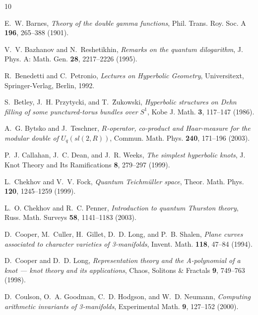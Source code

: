 \documentclass[12pt,reqno]{amsart}
\numberwithin{equation}{section}
\begin{document}
\begin{thebibliography}{10}
\providecommand{\url}[1]{\texttt{#1}}
\providecommand{\urlprefix}{URL }
\providecommand{\eprint}[2][]{\url{#2}}

E.~W. Barnes, \emph{Theory of the double gamma functions}, Phil. Trans. Roy.
  Soc. A \textbf{196}, 265--388 (1901).

V.~V. Bazhanov and N.~Reshetikhin, \emph{Remarks on the quantum dilogarithm},
  J. Phys. A: Math. Gen. \textbf{28}, 2217--2226 (1995).

R.~Benedetti and C.~Petronio, \emph{Lectures on Hyperbolic Geometry},
  Universitext, Springer-Verlag, Berlin, 1992.

S.~Betley, J.~H. Przytycki, and T.~\r{Z}ukowski, \emph{Hyperbolic structures on
  {Dehn} filling of some punctured-torus bundles over {$S^1$}}, Kobe J. Math.
  \textbf{3}, 117--147 (1986).

A.~G. Bytsko and J.~Teschner, \emph{{$R$}-operator, co-product and
  {Haar}-measure for the modular double of {$U_q(sl(2,R))$}}, Commun. Math.
  Phys. \textbf{240}, 171--196 (2003).

P.~J. Callahan, J.~C. Dean, and J.~R. Weeks, \emph{The simplest hyperbolic
  knots}, J. Knot Theory and Its Ramifications \textbf{8}, 279--297 (1999).

L.~Chekhov and V.~V. Fock, \emph{Quantum {Teichm{\"u}ller} space}, Theor. Math.
  Phys. \textbf{120}, 1245--1259 (1999).

L.~O. Chekhov and R.~C. Penner, \emph{Introduction to quantum {Thurston}
  theory}, Russ. Math. Surveys \textbf{58}, 1141--1183 (2003).

D.~Cooper, M.~Culler, H.~Gillet, D.~D. Long, and P.~B. Shalen, \emph{Plane
  curves associated to character varieties of 3-manifolds}, Invent. Math.
  \textbf{118}, 47--84 (1994).

D.~Cooper and D.~D. Long, \emph{Representation theory and the {A}-polynomial of
  a knot --- knot theory and its applications}, Chaos, Solitons \& Fractals
  \textbf{9}, 749--763 (1998).

D.~Coulson, O.~A. Goodman, C.~D. Hodgson, and W.~D. Neumann, \emph{Computing
  arithmetic invariants of 3-manifolds}, Experimental Math. \textbf{9},
  127--152 (2000).


\end{thebibliography}
\end{document}
